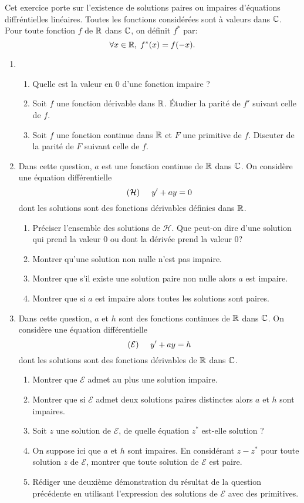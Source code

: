 Cet exercice porte sur l'existence de solutions paires ou impaires d'équations diffréntielles linéaires. Toutes les fonctions considérées sont à valeurs dans $\mathbb{C}$. Pour toute fonction $f$ de $\mathbb{R}$ dans $\mathbb{C}$, on définit $f^*$ par:
\[
 \forall x \in \mathbb{R},\; f^*(x) = f(-x).
\]

\begin{enumerate}
 \item 
 \begin{enumerate}
   \item Quelle est la valeur en $0$ d'une fonction impaire ?
   \item Soit $f$ une fonction dérivable dans $\mathbb{R}$. \'Etudier la parité de $f'$ suivant celle de $f$.
   \item Soit $f$ une fonction continue dans $\mathbb{R}$ et $F$ une primitive de $f$. Discuter de la parité de $F$ suivant celle de $f$.
 \end{enumerate}
 \item Dans cette question, $a$ est une fonction continue de $\mathbb{R}$ dans $\mathbb{C}$. On considère une équation différentielle 
\[
 (\mathcal{H})\hspace{0.5cm} y' + a y = 0
\]
dont les solutions sont des fonctions dérivables définies dans $\mathbb{R}$.
\begin{enumerate}
  \item Préciser l'ensemble des solutions de $\mathcal{H}$. Que peut-on dire d'une solution qui prend la valeur $0$ ou dont la dérivée prend la valeur $0$?
  \item Montrer qu'une solution non nulle n'est pas impaire.
  \item Montrer que s'il existe une solution paire non nulle alors $a$ est impaire.
  \item Montrer que si $a$ est impaire alors toutes les solutions sont paires.
\end{enumerate}

 \item Dans cette question, $a$ et $h$ sont des fonctions continues de $\mathbb{R}$ dans $\mathbb{C}$. On considère une équation différentielle 
\[
 (\mathcal{E})\hspace{0.5cm} y' + a y = h
\]
dont les solutions sont des fonctions dérivables de $\mathbb{R}$ dans $\mathbb{C}$.

\begin{enumerate}
 \item Montrer que $\mathcal{E}$ admet au plus une solution impaire. 
 \item Montrer que si $\mathcal{E}$ admet deux solutions paires distinctes alors $a$ et $h$ sont impaires.
 \item Soit $z$ une solution de $\mathcal{E}$, de quelle équation $z^*$ est-elle solution ?
 \item On suppose ici que $a$ et $h$ sont impaires. En considérant $z-z^*$ pour toute solution $z$ de $\mathcal{E}$, montrer que toute solution de $\mathcal{E}$ est paire.
 \item Rédiger une deuxième démonstration du résultat de la question précédente en utilisant l'expression des solutions de $\mathcal{E}$ avec des primitives.
\end{enumerate}


\end{enumerate}
